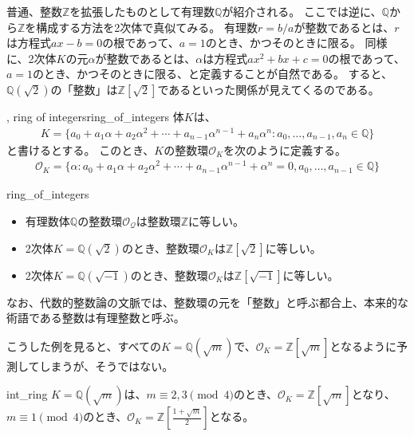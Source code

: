 普通、整数$\mathbb{Z}$を拡張したものとして有理数$\mathbb{Q}$が紹介される。
ここでは逆に、$\mathbb{Q}$から$\mathbb{Z}$を構成する方法を2次体で真似てみる。
有理数$r=b/a$が整数であるとは、$r$は方程式$ax-b=0$の根であって、$a=1$のとき、かつそのときに限る。
同様に、2次体$K$の元$\alpha$が整数であるとは、$\alpha$は方程式$ax^2+bx+c=0$の根であって、$a=1$のとき、かつそのときに限る、と定義することが自然である。
すると、$\mathbb{Q}(\sqrt{2})$の「整数」は$\mathbb{Z}[\sqrt{2}]$であるといった関係が見えてくるのである。

\begin{Defi}{, ring of integers}{ring_of_integers}
体$K$は、
\begin{align*}
K = \{a_0 + a_1\alpha + a_2\alpha^2 + \cdots + a_{n-1}\alpha^{n-1} + a_n\alpha^n : a_0,\ldots,a_{n-1},a_n \in \mathbb{Q}\}
\end{align*}
と書けるとする。
このとき、$K$の整数環$\mathcal{O}_K$を次のように定義する。
\begin{align*}
\mathcal{O}_K = \{\alpha : a_0 + a_1\alpha + a_2\alpha^2 + \cdots + a_{n-1}\alpha^{n-1} + \alpha^n = 0, a_0,\ldots,a_{n-1} \in \mathbb{Q}\}
\end{align*}
\end{Defi}

\begin{Exam}{}{ring_of_integers}\;
\begin{itemize}
 \item 有理数体$\mathbb{Q}$の整数環$\mathcal{O}_{\mathcal{Q}}$は整数環$\mathbb{Z}$に等しい。
 \item 2次体$K=\mathbb{Q}(\sqrt{2})$のとき、整数環$\mathcal{O}_K$は$\mathbb{Z}[\sqrt{2}]$に等しい。
 \item 2次体$K=\mathbb{Q}(\sqrt{-1})$のとき、整数環$\mathcal{O}_K$は$\mathbb{Z}[\sqrt{-1}]$に等しい。
\end{itemize}
\end{Exam}

なお、代数的整数論の文脈では、整数環の元を「整数」と呼ぶ都合上、本来的な術語である整数は有理整数と呼ぶ。

こうした例を見ると、すべての$K=\mathbb{Q}(\sqrt{m})$で、$\mathcal{O}_K=\mathbb{Z}[\sqrt{m}]$となるように予測してしまうが、そうではない。

\begin{Prop}{}{int_ring}
$K=\mathbb{Q}(\sqrt{m})$は、$m\equiv2,3\pmod{4}$のとき、$\mathcal{O}_K=\mathbb{Z}[\sqrt{m}]$となり、$m\equiv1\pmod{4}$のとき、$\mathcal{O}_K=\mathbb{Z}[\frac{1+\sqrt{m}}{2}]$となる。
\end{Prop}

